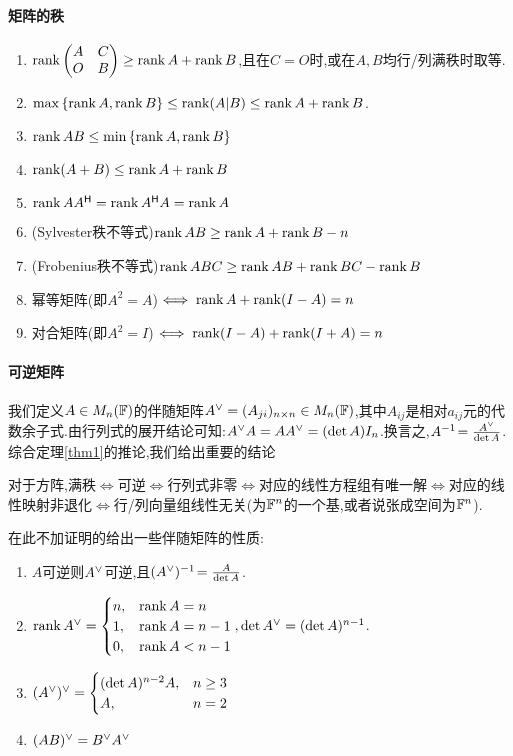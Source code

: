 \documentclass[openany]{book}
\begin{document}
\paragraph{矩阵的秩}
\begin{enumerate}
    \item $\operatorname{rank}\begin{pmatrix}
        A&C\\O&B
    \end{pmatrix}\geq \operatorname{rank} A+\operatorname{rank} B$,且在$C=O$时,或在$A,B$均行/列满秩时取等.
    \item $\max\left\{\operatorname{rank} A,\operatorname{rank} B\right\}\leq \operatorname{rank} (A|B)\leq \operatorname{rank} A+\operatorname{rank} B$.
    \item $\operatorname{rank} AB\leq \min\left\{\operatorname{rank} A,\operatorname{rank} B\right\}$
    \item $\operatorname{rank} (A+B)\leq \operatorname{rank} A+\operatorname{rank} B$
    \item $\operatorname{rank} AA^{\mathsf{H}}=\operatorname{rank} A^{\mathsf{H}} A=\operatorname{rank} A$
    \item (Sylvester秩不等式)$\operatorname{rank} AB\geq \operatorname{rank} A+\operatorname{rank} B-n$
    \item (Frobenius秩不等式)$\operatorname{rank} ABC\geq \operatorname{rank} AB+\operatorname{rank} BC-\operatorname{rank} B$
    \item 幂等矩阵(即$A^2=A$)$\iff \operatorname{rank} A+\operatorname{rank} (I-A)=n$ %
    \item 对合矩阵(即$A^2=I$)$\iff \operatorname{rank} (I-A)+\operatorname{rank} (I+A)=n$
\end{enumerate}

\paragraph{可逆矩阵}
我们定义$A\in M_n(\mathbb{F})$的伴随矩阵$A^\lor=(A_{ji})_{n\times n}\in M_n(\mathbb{F})$,其中$A_{ij}$是相对$a_{ij}$元的代数余子式.由行列式的展开结论可知:$A^\lor A=AA^\lor=(\det A)I_n$.换言之,$A^{-1}\!=\frac{A^\lor}{\det A}$.综合定理\ref{thm1}的推论,我们给出重要的结论
\begin{theorem}
    对于方阵,满秩$\iff$可逆$\iff$行列式非零$\iff$对应的线性方程组有唯一解$\iff$对应的线性映射非退化$\iff$行/列向量组线性无关(为$\mathbb{F}^n$的一个基,或者说张成空间为$\mathbb{F}^n$).
\end{theorem}

在此不加证明的给出一些伴随矩阵的性质:
\begin{enumerate}
    \item $A$可逆则$A^\lor$可逆,且$(A^\lor)^{-1}\!=\frac{A}{\det A}$.
    \item $\operatorname{rank} A^\lor=\begin{cases}
        n,&\operatorname{rank} A=n\\
        1,&\operatorname{rank} A=n-1\\
        0,&\operatorname{rank} A<n-1
    \end{cases},\det A^\lor=(\det A)^{n-1}$.
    \item $(A^\lor)^\lor=\begin{cases}
        (\det A)^{n-2}A,&n\geq 3\\
        A,&n=2
    \end{cases}$
    \item $(AB)^\lor=B^\lor A^\lor$
\end{enumerate}
\end{document}
